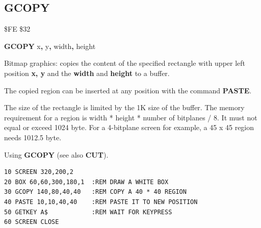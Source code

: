 
\newpage
\subsection{GCOPY}
\begin{description}[leftmargin=2cm,style=nextline]
\item [Token:] \$FE \$32
\item [Format:] {\bf GCOPY} x{\bf,} y{\bf,} width{\bf,} height
\item [Usage:] Bitmap graphics: copies the content
               of the specified rectangle
               with upper left position {\bf x, y} and the {\bf width}
               and {\bf height} to a buffer.

               The copied region can be inserted at any position with the
               command {\bf PASTE}.

\item [Remarks:] The size of the rectangle is limited by the 1K size of
                 the buffer. The memory requirement for
                 a region is width * height * number of bitplanes / 8.
                 It must not equal or exceed 1024 byte.
                 For a 4-bitplane screen for example, a 45 x 45 region
                 needs 1012.5 byte.

\item [Example:] Using {\bf GCOPY} (see also {\bf CUT}).
\begin{tcolorbox}[colback=black,coltext=white]
\verbatimfont{\codefont}
\begin{verbatim}
10 SCREEN 320,200,2
20 BOX 60,60,300,180,1  :REM DRAW A WHITE BOX
30 GCOPY 140,80,40,40   :REM COPY A 40 * 40 REGION
40 PASTE 10,10,40,40    :REM PASTE IT TO NEW POSITION
50 GETKEY A$            :REM WAIT FOR KEYPRESS
60 SCREEN CLOSE
\end{verbatim}
\end{tcolorbox}
\end{description}


\newpage
